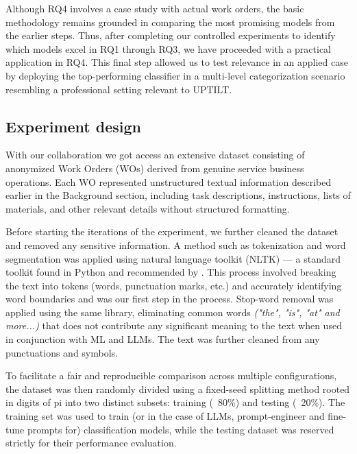 Although RQ4 involves a case study with actual work orders, the basic methodology remains grounded in comparing the most promising models from the earlier steps. Thus, after completing our controlled experiments to identify which models excel in RQ1 through RQ3, we have proceeded with a practical application in RQ4. This final step allowed us to test  relevance in an applied case by deploying the top-performing classifier in a multi-level categorization scenario resembling a professional setting relevant to UPTILT.


\subsection{Experiment design}
With our collaboration we got access an extensive dataset consisting of anonymized Work Orders (WOs) derived from genuine service business operations. Each WO represented unstructured textual information described earlier in the Background section, including task descriptions, instructions, lists of materials, and other relevant details without structured formatting.

Before starting the iterations of the experiment, we further cleaned the dataset and removed any sensitive information. A method such as tokenization and word segmentation was applied using natural language toolkit (NLTK) --- a standard toolkit found in Python and recommended by \cite{bird2009nlp}. This process involved breaking the text into tokens (words, punctuation marks, etc.) and accurately identifying word boundaries and was our first step in the process. Stop-word removal was applied using the same library, eliminating common words \textit{("the", "is", "at" and more...)} that does not contribute any significant meaning to the text when used in conjunction with ML and LLMs. The text was further cleaned from any punctuations and symbols.

To facilitate a fair and reproducible comparison across multiple configurations, the dataset was then randomly divided using a fixed-seed splitting method rooted in digits of pi into two distinct subsets: training (~80\%) and testing (~20\%). The training set was used to train (or in the case of LLMs, prompt-engineer and fine-tune prompts for) classification models, while the testing dataset was reserved strictly for their performance evaluation.

